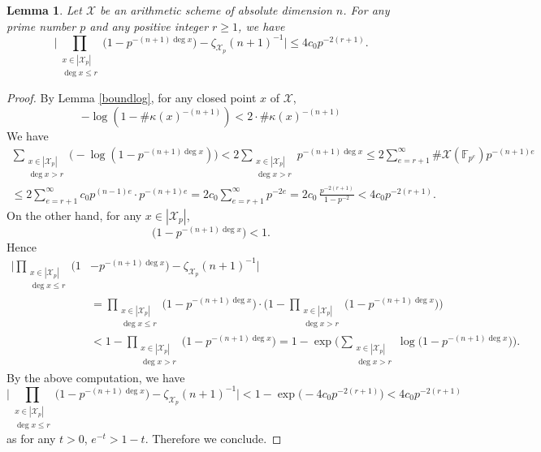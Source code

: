 \documentclass[11pt]{article}
\numberwithin{equation}{section}
\theoremstyle{plain}
\newtheorem{lem}[thm]{Lemma}
\theoremstyle{definition}
\newcommand{\X}{\mathcal{X}}
\newcommand{\F}{\mathbb{F}}
\begin{document}
\begin{lem}\label{zetafinite}
Let $\X$ be an arithmetic scheme of absolute dimension $n$. For any prime number $p$ and any positive integer $r\geq 1$, we have
\[
\biggl| \prod_{\substack{x\in |\X_{p}|\\ \deg x\leq r}} \bigl(1-p^{-(n+1)\deg x} \bigr) - \zeta_{\X_p}(n+1)^{-1} \biggr|\leq 4c_0 p^{-2(r+1)}.
\]
\end{lem}
\begin{proof}
By Lemma \ref{boundlog}, for any closed point $x$ of $\X$,
\[
- \log(1-\#\kappa(x)^{-(n+1)})<2\cdot\#\kappa(x)^{-(n+1)}
\]
We have
\begin{multline*}
\sum_{\substack{x\in |\X_{p}|\\ \deg x> r}}\bigl(- \log(1-p^{-(n+1)\deg x}) \bigr) < 2\sum_{\substack{x\in |\X_{p}|\\ \deg x> r}} p^{-(n+1)\deg x} \leq 2\sum_{e=r+1}^{\infty}\#\X(\F_{p^e}) p^{-(n+1)e} \\
\leq 2\sum_{e=r+1}^{\infty}c_0p^{(n-1)e}\cdot p^{-(n+1)e} 
= 2c_0\sum_{e=r+1}^{\infty} p^{-2e}= 2c_0\,\frac{p^{-2(r+1)}}{1-p^{-2}}< 4c_0p^{-2(r+1)}.
\end{multline*}
On the other hand, for any $x\in |\X_{p}|$,
\[
\bigl(1-p^{-(n+1)\deg x} \bigr)<1.
\]
Hence
\begin{align*}
\biggl| \prod_{\substack{x\in |\X_{p}|\\ \deg x\leq r}} \bigl(1&-p^{-(n+1)\deg x} \bigr) - \zeta_{\X_p}(n+1)^{-1} \biggr| \\[-5pt]
&= \prod_{\substack{x\in |\X_{p}|\\ \deg x\leq r}} \bigl(1-p^{-(n+1)\deg x} \bigr)\cdot \biggl(1- \prod_{\substack{x\in |\X_{p}|\\ \deg x> r}} \bigl(1-p^{-(n+1)\deg x} \bigr) \biggr) \\
&<1- \prod_{\substack{x\in |\X_{p}|\\ \deg x> r}} \bigl(1-p^{-(n+1)\deg x} \bigr) =1-\exp \biggl(\sum_{\substack{x\in |\X_{p}|\\ \deg x> r}} \log \bigl(1-p^{-(n+1)\deg x} \bigr) \biggr).
\end{align*}
By the above computation, we have
\[
\biggl | \prod_{\substack{x\in |\X_{p}|\\ \deg x\leq r}} \bigl(1-p^{-(n+1)\deg x} \bigr) - \zeta_{\X_p}(n+1)^{-1} \biggr|
< 1-\exp \bigl(-4c_0p^{-2(r+1)} \bigr) < 4c_0p^{-2(r+1)}
\]
as for any $t>0$, $e^{-t}>1-t$. Therefore we conclude.
\end{proof}
\end{document}
